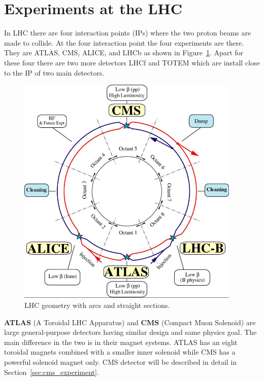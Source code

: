 
\section{Experiments at the LHC} %
\label{sec:experiments_at_the_lhc}

In LHC there are four interaction points (IPs) where the two proton beams are made to collide. At the four interaction point the four experiments are there. They are ATLAS, CMS, ALICE, and LHCb as shown in Figure~\ref{fig:LHCgeometry}. Apart for these four there are two more detectors LHCf and TOTEM which are install close to the IP of two main detectors.
\begin{figure}[!htbp]
	\centering
	\includegraphics[width=0.95\textwidth]{figures/LHC/lhc-schematic.jpg}
	\caption{LHC geometry with arcs and straight sections.}
	\label{fig:LHCgeometry}
\end{figure}

{\bf ATLAS} (A Toroidal LHC Apparatus) and {\bf CMS} (Compact Muon Solenoid) are large general-purpose detectors having similar design and same physics goal. The main difference in the two is in their magnet systems. ATLAS has an eight toroidal magnets combined with a smaller inner solenoid while CMS has a powerful solenoid magnet only. CMS detector will be described in detail in Section~\ref{sec:cms_experiment}.

